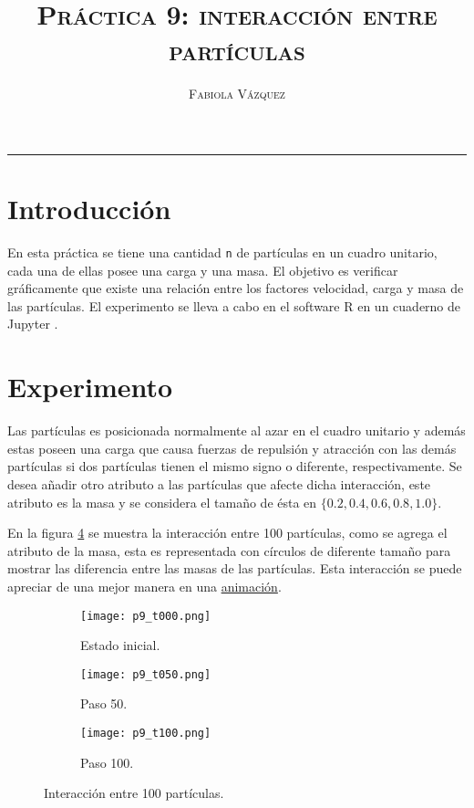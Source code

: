 \documentclass[12pt,letterpaper]{article}
\title{\textsc{Práctica 9: interacción entre partículas}}
\author{\textsc{Fabiola Vázquez}}
\begin{document}
\maketitle

\hrule
\section{Introducción}
En esta práctica \cite{elisapractica9} se tiene una cantidad \texttt{n} de partículas en un cuadro unitario, cada una de ellas posee una carga y una masa. El objetivo es verificar gráficamente que existe una relación entre los factores velocidad, carga y masa de las partículas. El experimento se lleva a cabo en el software R \cite{R} en un cuaderno de Jupyter \cite{jupyter}.

\section{Experimento}
Las partículas es posicionada normalmente al azar en el cuadro unitario y además estas poseen una carga que causa fuerzas de repulsión y atracción con las demás partículas si dos partículas tienen el mismo signo o diferente, respectivamente. Se desea añadir otro atributo a las partículas que afecte dicha interacción, este atributo es la masa y se considera el tamaño de ésta en $\{0.2, 0.4, 0.6, 0.8, 1.0\}.$ 

En la figura \ref{im} se muestra la interacción entre 100 partículas, como se agrega el atributo de la masa, esta es representada con círculos de diferente tamaño para mostrar las diferencia entre las masas de las partículas. Esta interacción se puede apreciar de una mejor manera en una \href{https://github.com/fvzqa/Simulacion/blob/master/Tarea09/Images/p9.gif}{animación}.
 \begin{figure}
 	\centering 
 	\begin{subfigure}[b]{0.3\linewidth}
 		\texttt{[image: p9\_t000.png]} 		
 		\caption{Estado inicial.}
 		 		\label{1}
 	\end{subfigure}  \hfill
 	\begin{subfigure}[b]{0.3\linewidth}
 		\texttt{[image: p9\_t050.png]} 		
 		\caption{Paso 50.}
 		\label{2}
 	\end{subfigure} \hfill
 	 	\begin{subfigure}[b]{0.3\linewidth}
 		\texttt{[image: p9\_t100.png]} 		
 		\caption{Paso 100.}
 		\label{3}
 	\end{subfigure}
 	 	\caption{Interacción entre 100 partículas.} 
 	 		\label{im}
\end{figure} 
\end{document}
